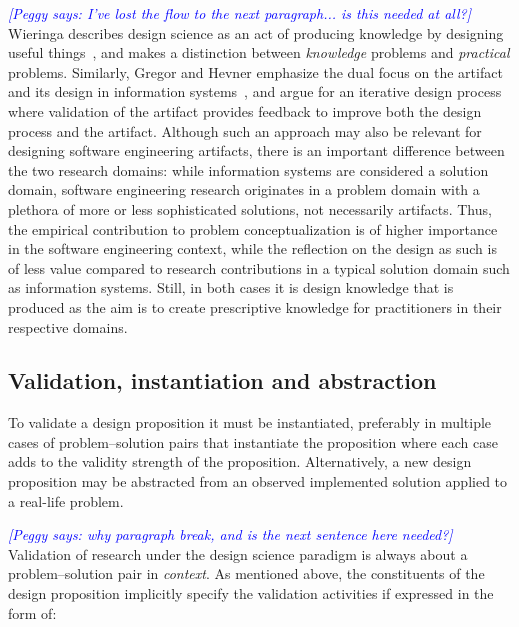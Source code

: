 \documentclass[graybox]{svmult}
\newcommand{\peggy}[1]{\textcolor{blue}{{\it [Peggy says: #1]}}}
\newcommand{\peggy}[1]{}
\begin{document}
\peggy{I've lost the flow to the next paragraph... is this needed at all?}
Wieringa describes design science as an act of producing knowledge by designing useful things~\cite{wieringa_design_2009}, and makes a distinction between \emph{knowledge} problems and \emph{practical} problems. Similarly, Gregor and Hevner emphasize the dual focus on the artifact and its design in information systems~\cite{gregor_positioning_2013}, and argue for an iterative design process where validation of the artifact provides feedback to improve both the design process and the artifact. Although such an approach may also be relevant for designing software engineering artifacts, there is an important difference between the two research domains: while information systems are considered a solution domain, software engineering research originates in a problem domain with a plethora of more or less sophisticated solutions, not necessarily artifacts. Thus, the empirical contribution to problem conceptualization is of higher importance in the software engineering context, while the reflection on the design as such is of less value compared to research contributions in a typical solution domain such as information systems. Still, in both cases it is design knowledge that is produced as the aim is to create prescriptive knowledge for practitioners in their respective domains. 

 

\subsection{Validation, instantiation and abstraction}

To validate a design proposition it must be instantiated, preferably in multiple cases of problem--solution pairs that instantiate the proposition where each case adds to the validity strength of the proposition. Alternatively, a new design proposition may be abstracted from an observed implemented solution applied to a real-life problem.

\peggy{why paragraph break, and is the next sentence here needed?}
Validation of research under the design science paradigm is always about a problem--solution pair in \emph{context}. As mentioned above, the constituents of the design proposition implicitly specify the validation activities if expressed in the form of:
\end{document}

